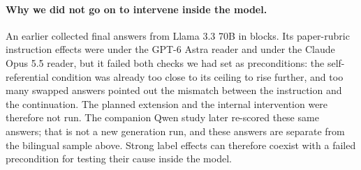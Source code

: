 \paragraph{Why we did not go on to intervene inside the model.}
An earlier
 collected \CEQualificationAnswers{} final answers from
Llama 3.3 70B in
\CEQualificationBlocks{} blocks. Its paper-rubric instruction effects were
\CEQualificationAstraInstruction{} under the GPT-6 Astra reader and
\CEQualificationOpusInstruction{} under the Claude Opus 5.5 reader, but
it failed both checks we had set as preconditions: the self-referential
condition was already too close to its ceiling to rise further, and too many
swapped answers pointed out the mismatch between the instruction and the
continuation. The planned extension and the internal intervention were
therefore not run. The companion Qwen study later re-scored these same
answers; that is not a new generation run, and these answers are separate from
the bilingual sample above. Strong label effects can therefore coexist with a
failed precondition for testing their cause inside the model.
